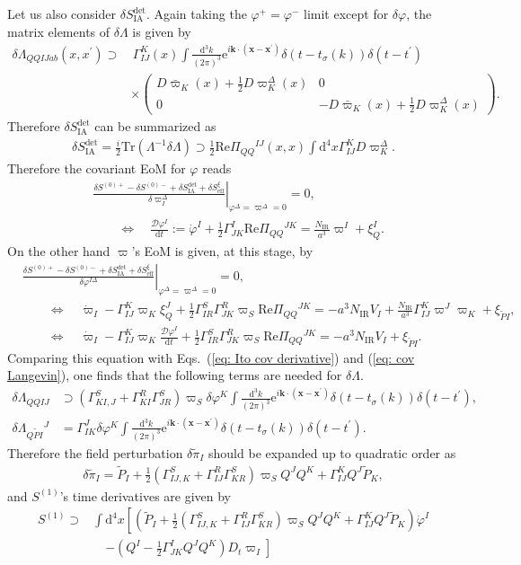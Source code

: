 \documentclass[aps, prd
, preprint
, nofootinbib 
, notitlepage
, longbibliography
]{revtex4-1}
\newcommand{\dd}{\mathrm{d}}
\newcommand{\ee}{\mathrm{e}}
\newcommand{\IR}{\text{IR}}
\renewcommand{\Re}{\mathrm{Re}}
\newcommand{\eff}{\text{eff}}
\newcommand{\Tr}{\mathrm{Tr}}
\newcommand{\IA}{\mathrm{IA}}
\newcommand{\calD}{\mathcal{D}}
\newcommand{\bae}[1]{\begin{align} #1 \end{align}}
\newcommand{\bpme}[1]{\begin{pmatrix} #1 \end{pmatrix}}
\begin{document}
\bigskip

Let us also consider $\delta S_\IA^\mathrm{det}$.
Again taking the $\varphi^+=\varphi^-$ limit except for $\delta\varphi$, the matrix elements of $\delta\Lambda$ is given by
\bae{
    \delta\Lambda_{QQIJab}(x,x^\prime)\supset&\,\Gamma^K_{IJ}(x)\int\frac{\dd^3k}{(2\pi)^3}\ee^{i\mathbf{k}\cdot(\mathbf{x}-\mathbf{x}^\prime)}\delta(t-t_\sigma(k))\delta(t-t^\prime) \nonumber \\
    &\times\bpme{
        D\bar{\varpi}_K(x)+\frac{1}{2}D\varpi_K^\Delta(x) & 0 \\
        0 & -D\bar{\varpi}_K(x)+\frac{1}{2}D\varpi_K^\Delta(x)
    }.
}
Therefore $\delta S_\IA^\mathrm{det}$ can be summarized as
\bae{
    \delta S_\IA^\mathrm{det}=\frac{i}{2}\Tr(\Lambda^{-1}\delta\Lambda)\supset\frac{1}{2}\Re\Pi_{QQ}{}^{IJ}(x,x)\int\dd^4x\Gamma_{IJ}^KD\varpi_K^\Delta.
}
Therefore the covariant EoM for $\varphi$ reads
\bae{
	&\left.\frac{\delta S^{(0)+}-\delta S^{(0)-}+\delta S_\IA^\mathrm{det}+\delta S_\eff^\xi}{\delta\varpi_I^\Delta}\right|_{\varphi^\Delta=\varpi^\Delta=0}=0, \nonumber \\ &\qquad \Leftrightarrow
	\quad \frac{\calD\varphi^I}{\dd t}:=\dot{\varphi}^I+\frac{1}{2}\Gamma^I_{JK}\Re\Pi_{QQ}{}^{JK}=\frac{N_\IR}{a^3}\varpi^I+\xi_Q^I.
}
On the other hand $\varpi$'s EoM is given, at this stage, by
\bae{
    &\left.\frac{\delta S^{(0)+}-\delta S^{(0)-}+\delta S_\IA^\mathrm{det}+\delta S_\eff^\xi}{\delta\varphi^{I\Delta}}\right|_{\varphi^\Delta=\varpi^\Delta=0}=0, \nonumber \\
    &\qquad \Leftrightarrow \quad \dot{\varpi}_I-\Gamma_{IJ}^K\varpi_K\xi_Q^J+\frac{1}{2}\Gamma^S_{IR}\Gamma^R_{JK}\varpi_S\Re\Pi_{QQ}{}^{JK}=-a^3N_\IR V_I+\frac{N_\IR}{a^3}\Gamma_{IJ}^K\varpi^J\varpi_K+\xi_{\tilde{P}I}, \nonumber \\
    &\qquad \Leftrightarrow \quad
    \dot{\varpi}_I-\Gamma^K_{IJ}\varpi_K\frac{\calD\varphi^I}{\dd t}+\frac{1}{2}\Gamma^S_{IR}\Gamma^R_{JK}\varpi_S\Re\Pi_{QQ}{}^{JK}=-a^3N_\IR V_I+\xi_{\tilde{P}I}.
}
Comparing this equation with Eqs.~(\ref{eq: Ito cov derivative}) and (\ref{eq: cov Langevin}),
one finds that the following terms are needed for $\delta\Lambda$.
\bae{
    \delta\Lambda_{QQIJ}&\supset(\Gamma^S_{KI,J}+\Gamma^R_{KI}\Gamma^S_{JR})\varpi_S\delta\varphi^K\int\frac{\dd^3k}{(2\pi)^3}\ee^{i\mathbf{k}\cdot(\mathbf{x}-\mathbf{x}^\prime)}\delta(t-t_\sigma(k))\delta(t-t^\prime), \\
    \delta\Lambda_{Q\tilde{P}I}{}^J&=\Gamma^J_{IK}\delta\varphi^K\int\frac{\dd^3k}{(2\pi)^3}\ee^{i\mathbf{k}\cdot(\mathbf{x}-\mathbf{x}^\prime)}\delta(t-t_\sigma(k))\delta(t-t^\prime).
}
Therefore the field perturbation $\delta\tilde{\pi}_I$ should be expanded up to quadratic order as
\bae{\label{eq: expansion of delta pi}
    \delta\tilde{\pi}_I=\tilde{P}_I+\frac{1}{2}(\Gamma^S_{IJ,K}+\Gamma^R_{IJ}\Gamma^S_{KR})\varpi_SQ^JQ^K+\Gamma^K_{IJ}Q^J\tilde{P}_K,
}
and $S^{(1)}$'s time derivatives are given by
\bae{
    S^{(1)}\supset&\int\dd^4x\left[\left(\tilde{P}_I+\frac{1}{2}(\Gamma^S_{IJ,K}+\Gamma^R_{IJ}\Gamma^S_{KR})\varpi_SQ^JQ^K+\Gamma^K_{IJ}Q^J\tilde{P}_K\right)\dot{\varphi}^I \right. \nonumber \\
    &\quad\left.-\left(Q^I-\frac{1}{2}\Gamma^I_{JK}Q^JQ^K\right)D_t\varpi_I\right]
}
\end{document}
